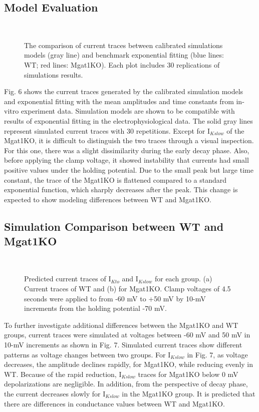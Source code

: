 \documentclass[journal]{IEEEtran}
\begin{document}
\subsection{Model Evaluation}
\begin{figure}
    \label{fig 6}
    \centering
    \\
    \caption{The comparison of current traces between calibrated simulations models (gray line) and benchmark exponential fitting (blue lines: WT; red lines: Mgat1KO). Each plot includes 30 replications of simulations results.}
\end{figure}
Fig. 6 shows the current traces generated by the calibrated simulation models and exponential fitting with the mean amplitudes and time constants from in-vitro experiment data. Simulation models are shown to be compatible with results of exponential fitting in the electrophysiological data. The solid gray lines represent simulated current traces with 30 repetitions. Except for $\text{I}_{Kslow}$ of the Mgat1KO, it is difficult to distinguish the two traces through a visual inspection. For this one, there was a slight dissimilarity during the early decay phase. Also, before applying the clamp voltage, it showed instability that currents had small positive values under the holding potential. Due to the small peak but large time constant, the trace of the Mgat1KO is flattened compared to a standard exponential function, which sharply decreases after the peak. This change is expected to show modeling differences between WT and Mgat1KO.

\subsection{Simulation Comparison between WT and Mgat1KO}
\begin{figure}
    \label{fig 7}
    \centering
    \\
    \caption{Predicted current traces of $\text{I}_{Kto}$ and $\text{I}_{Kslow}$ for each group. (a) Current traces of WT and (b) for Mgat1KO. Clamp voltages of 4.5 seconds were applied to from -60 mV to +50 mV by 10-mV increments from the holding potential -70 mV.}
\end{figure}
To further investigate additional differences between the Mgat1KO and WT groups, current traces were simulated at voltages between -60 mV and 50 mV in 10-mV increments as shown in Fig. 7. Simulated current traces show different patterns as voltage changes between two groups. For $\text{I}_{Kslow}$ in Fig. 7, as voltage decreases, the amplitude declines rapidly, for Mgat1KO, while reducing evenly in WT. Because of the rapid reduction, $\text{I}_{Kslow}$ traces for Mgat1KO below 0 mV depolarizations are negligible. In addition, from the perspective of decay phase, the current decreases slowly for $\text{I}_{Kslow}$ in the Mgat1KO group. It is predicted that there are differences in conductance values between WT and Mgat1KO.
\end{document}
